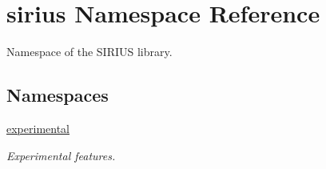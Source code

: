 \hypertarget{namespacesirius}{}\section{sirius Namespace Reference}
\label{namespacesirius}


Namespace of the S\+I\+R\+I\+U\+S library.  


\subsection*{Namespaces}
\begin{DoxyCompactItemize}
\item 
 \hyperlink{namespacesirius_1_1experimental}{experimental}
\begin{DoxyCompactList}\small\item\em Experimental features. \end{DoxyCompactList}\end{DoxyCompactItemize}
